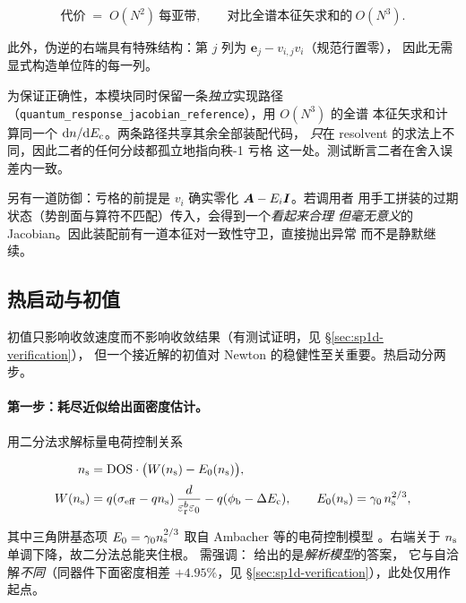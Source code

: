 \begin{equation}
\text{代价} \;=\; O(N^{2})\ \text{每亚带},
\qquad\text{对比全谱本征矢求和的}\ O(N^{3}).
\label{eq:complexity}
\end{equation}

此外，伪逆的右端具有特殊结构：第 $j$ 列为 $\bm{e}_j - v_{i,j}v_i$（规范行置零），
因此无需显式构造单位阵的每一列。

为保证正确性，本模块同时保留一条\emph{独立}实现路径
（\texttt{quantum\_response\_jacobian\_reference}），用 $O(N^{3})$ 的全谱
本征矢求和计算同一个 $\mathrm{d} n/\mathrm{d}E_{\mathrm{c}}$。两条路径共享其余全部装配代码，
\emph{只}在 resolvent 的求法上不同，因此二者的任何分歧都孤立地指向秩-1 亏格
这一处。测试断言二者在舍入误差内一致。

另有一道防御：亏格的前提是 $v_i$ 确实零化 $\bm{A}-E_{i}\bm{I}$。若调用者
用手工拼装的过期状态（势剖面与算符不匹配）传入，会得到一个\emph{看起来合理
但毫无意义}的 Jacobian。因此装配前有一道本征对一致性守卫，直接抛出异常
而不是静默继续。

\subsection{热启动与初值}
\label{sec:sp1d-warmstart}

初值只影响收敛速度而不影响收敛结果（有测试证明，见 \S\ref{sec:sp1d-verification}），
但一个接近解的初值对 Newton 的稳健性至关重要。热启动分两步。

\paragraph{第一步：耗尽近似给出面密度估计。}
用二分法求解标量电荷控制关系

\begin{equation}
\begin{aligned}
n_{\mathrm{s}} &= \mathrm{DOS}\cdot\bigl(W(n_{\mathrm{s}}) - E_0(n_{\mathrm{s}})\bigr),\\[2pt]
W(n_{\mathrm{s}}) &= q\!\left(\sigma_{\mathrm{eff}}-qn_{\mathrm{s}}\right)\frac{d}{\varepsilon_{\mathrm{r}}^{b}\varepsilon_{0}} - q(\phi_{\mathrm{b}}-\Delta E_{\mathrm{c}}),
\qquad
E_0(n_{\mathrm{s}})=\gamma_0\,n_{\mathrm{s}}^{2/3},
\end{aligned}
\label{eq:depletion-seed}
\end{equation}

其中三角阱基态项 $E_0=\gamma_0n_{\mathrm{s}}^{2/3}$ 取自 Ambacher 等的电荷控制模型
\cite{ambacher2000}。右端关于 $n_{\mathrm{s}}$ 单调下降，故二分法总能夹住根。
需强调： 给出的是\emph{解析模型}的答案，
它与自洽解\emph{不同}（同器件下面密度相差 $+4.95\%$，见
\S\ref{sec:sp1d-verification}），此处仅用作起点。

